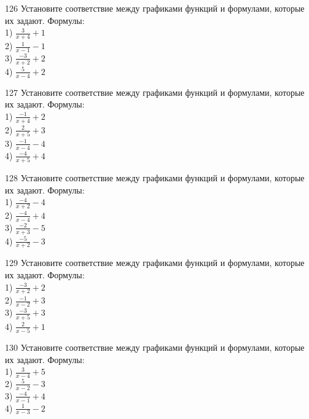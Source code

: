 \documentclass[4apaper]{article}
\begin{document}
\begin{taskBN}{126}
Установите соответствие между графиками функций и формулами, которые их задают. Формулы: \\1) $\frac{3}{x+4}+1$\\2) $\frac{1}{x-1}-1$\\3) $\frac{-3}{x+2}+2$\\4) $\frac{5}{x-4}+2$
\end{taskBN}

\begin{taskBN}{127}
Установите соответствие между графиками функций и формулами, которые их задают. Формулы: \\1) $\frac{-1}{x+4}+2$\\2) $\frac{2}{x+5}+3$\\3) $\frac{-1}{x-4}-4$\\4) $\frac{-4}{x+5}+4$
\end{taskBN}

\begin{taskBN}{128}
Установите соответствие между графиками функций и формулами, которые их задают. Формулы: \\1) $\frac{-4}{x+2}-4$\\2) $\frac{-4}{x-4}+4$\\3) $\frac{-2}{x+3}-5$\\4) $\frac{-5}{x+2}-3$
\end{taskBN}

\begin{taskBN}{129}
Установите соответствие между графиками функций и формулами, которые их задают. Формулы: \\1) $\frac{-3}{x+2}+2$\\2) $\frac{-1}{x-2}+3$\\3) $\frac{-3}{x+5}+3$\\4) $\frac{2}{x-5}+1$
\end{taskBN}

\begin{taskBN}{130}
Установите соответствие между графиками функций и формулами, которые их задают. Формулы: \\1) $\frac{3}{x-4}+5$\\2) $\frac{5}{x-2}-3$\\3) $\frac{-4}{x-1}+4$\\4) $\frac{1}{x-3}-2$
\end{taskBN}
\end{document}
